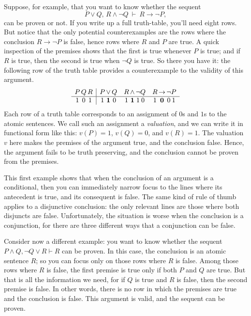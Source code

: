 Suppose, for example, that you want to know whether the sequent
\[ P\vee Q,\,R\wedge \neg Q\:\vdash\:R\to \neg P ,\] can be proven or
not.  If you write up a full truth-table, you'll need eight rows.  But
notice that the only potential counterexamples are the rows where the
conclusion $R\to \neg P$ is false, hence rows where $R$ and $P$ are
true.  A quick inspection of the premises shows that the first is true
whenever $P$ is true; and if $R$ is true, then the second is true when
$\neg Q$ is true.  So there you have it: the following row of the
truth table provides a counterexample to the validity of this
argument.
\[ \begin{array}{ c@{\, }c@{\, }c | c@{\, }c@{\, }c c@{\, }c@{\, }c@{ }c c@{\,
     }c@{\, }c@{ }c }
P & Q & R & P & \vee & Q & R & \wedge & \neg & Q & R & \to & \neg &
                                                                    P
     \\
     \hline
1 & 0 & 1 & 1 & \mathbf{1} &   0  & 1 & \mathbf{1}      & 1    & 0 & 1 & \mathbf{0}   & 0 & 1 \end{array} \]
Each row of a truth table corresponds to an assignment of $0$s and
$1$s to the atomic sentences.  We call such an assignment a
\emph{valuation}, and we can write it in functional form like this: $v(P)=1$, $v(Q)=0$, and
$v(R)=1$.  The valuation $v$ here makes the premises of the argument
true, and the conclusion false.  Hence, the argument fails to be truth
preserving, and the conclusion cannot be proven from the premises.

This first example shows that when the conclusion of an argument is a
conditional, then you can immediately narrow focus to the lines where
its antecedent is true, and its consequent is false.  The same kind of
rule of thumb applies to a disjunctive conclusion: the only relevant
lines are those where both disjuncts are false.  Unfortunately, the
situation is worse when the conclusion is a conjunction, for there are
three different ways that a conjunction can be false.

Consider now a different example: you want to know whether the sequent
$P\wedge Q,\neg Q\vee R\vdash R$ can be proven.  In this case, the
conclusion is an atomic sentence $R$; so you can focus only on those
rows where $R$ is false.  Among those rows where $R$ is false, the
first premise is true only if both $P$ and $Q$ are true.  But that is
all the information we need, for if $Q$ is true and $R$ is false, then
the second premise is false.  In other words, there is no row in which
the premises are true and the conclusion is false.  This argument is
valid, and the sequent can be proven.


